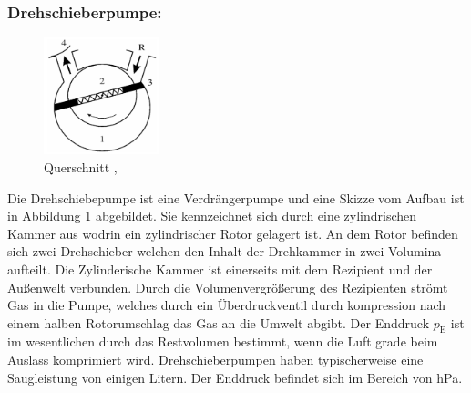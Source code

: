 \subsubsection{Drehschieberpumpe:}
\begin{figure}
    \vspace{-1cm}
    \centering
    \includegraphics[width=0.3\textwidth]{./picture/Drehschieberpumpe.png}
    \caption{Querschnitt \cite{Dreh},\cite{Jena}}
    \label{fig:Dreh}
\end{figure}
Die Drehschiebepumpe ist eine Verdrängerpumpe und eine Skizze vom Aufbau ist in Abbildung \ref{fig:Dreh} abgebildet. Sie kennzeichnet sich durch eine zylindrischen Kammer aus wodrin ein zylindrischer Rotor gelagert ist. An dem Rotor befinden sich zwei Drehschieber welchen den Inhalt der Drehkammer in zwei Volumina aufteilt. Die Zylinderische Kammer ist einerseits mit dem Rezipient und der Außenwelt verbunden. Durch die Volumenvergrößerung des Rezipienten strömt Gas in die Pumpe, welches durch ein Überdruckventil durch kompression nach einem halben Rotorumschlag das Gas an die Umwelt abgibt. Der Enddruck $p_\text{E}$ ist im wesentlichen durch das Restvolumen bestimmt, wenn die Luft grade beim Auslass komprimiert wird. Drehschieberpumpen haben typischerweise eine Saugleistung von einigen Litern. Der Enddruck befindet sich im Bereich von hPa. 
